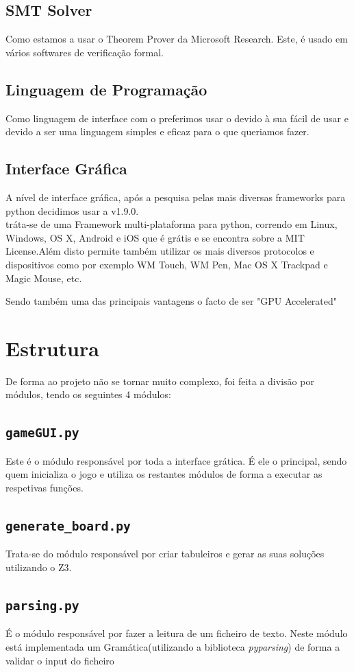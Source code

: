 \documentclass{article}
\begin{document}
\subsection{SMT Solver}
Como {} estamos a usar o {} Theorem Prover da Microsoft Research. Este, é usado em vários softwares de verificação formal. 

\subsection{Linguagem de Programação}
Como linguagem de interface com o {} preferimos usar o {} {} devido à sua {} fácil de usar e devido a ser uma linguagem simples e eficaz para o que queriamos fazer.
\subsection{Interface Gráfica}
A nível de interface gráfica, após a pesquisa pelas mais diversas frameworks para python decidimos usar a {} v1.9.0. 
\\
{} tráta-se de uma Framework multi-plataforma para python, correndo em Linux, Windows, OS X, Android e iOS que é grátis e se encontra sobre a MIT License.Além disto permite também utilizar os mais diversos protocolos e dispositivos como por exemplo WM Touch, WM Pen, Mac OS X Trackpad e Magic Mouse, etc.

Sendo também uma das principais vantagens o facto de ser "GPU Accelerated"
\newpage
\section{Estrutura}
De forma ao projeto não se tornar muito complexo, foi feita a divisão por módulos, tendo os seguintes 4 módulos:

\subsection{\texttt{gameGUI.py}}
Este é o módulo responsável por toda a interface grática. É ele o principal, sendo quem inicializa o jogo e utiliza os restantes módulos de forma a executar as respetivas funções.
\subsection{\texttt{generate\_board.py}}
Trata-se do módulo responsável por criar tabuleiros e gerar as suas soluções utilizando o Z3.
\subsection{\texttt{parsing.py}}
É o módulo responsável por fazer a leitura de um ficheiro de texto. Neste módulo está implementada um Gramática(utilizando a biblioteca {\it{pyparsing}}) de forma a validar o input do ficheiro
\end{document}
